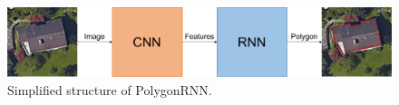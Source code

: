 \begin{figure}[!h]
	\centering
	\includegraphics[width=\fig\textwidth]{3-00.pdf}
    \caption[Simplified structure of PolygonRNN]{Simplified structure of PolygonRNN.}
    \label{fig:simppoly}
\end{figure}